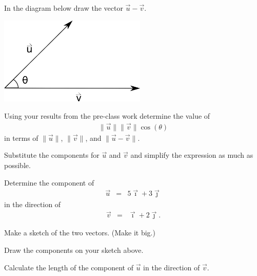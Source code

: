 \begin{problem}
\item  In the diagram below draw the vector $\vec{u}-\vec{v}$.

  \includegraphics[width=7cm]{ink/week11/dotProduct}

\item Using your results from the pre-class work determine the value
  of
  \begin{eqnarray*}
    \| \vec{u} \| \| \vec{v} \| \cos(\theta)
  \end{eqnarray*}
  in terms of $\|\vec{u}\|$, $\|\vec{v}\|$, and $\|\vec{u}-\vec{v}\|$.

  \vfill

\item Substitute the components for $\vec{u}$ and $\vec{v}$ and
  simplify the expression as much as possible.

  \vfill

\clearpage

\item Determine the component of
  \begin{eqnarray*}
    \vec{u} & = & 5 \vec{\imath} + 3 \vec{\jmath}
  \end{eqnarray*}
  in the direction of
  \begin{eqnarray*}
    \vec{v} & = & \vec{\imath} + 2 \vec{\jmath}.
  \end{eqnarray*}

  \begin{subproblem}
  \item Make a sketch of the two vectors. (Make it big.)
    \vfill
  \item Draw the components on your sketch above.
  \item Calculate the length of the component of $\vec{u}$ in the
    direction of $\vec{v}$.
    \vfill
  \end{subproblem}

\end{problem}


\postClass

